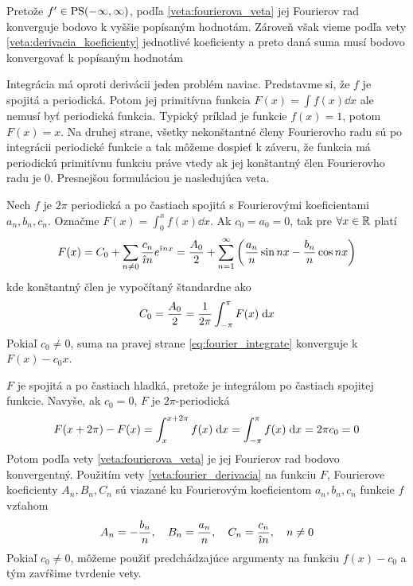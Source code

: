 \begin{dokaz}
  Pretože $f'\in \mbox{PS}(-\infty,\infty)$, podľa \ref{veta:fourierova_veta} jej Fourierov rad
  konverguje bodovo k vyššie popísaným hodnotám. Zároveň však vieme
  podľa vety \ref{veta:derivacia_koeficienty} jednotlivé koeficienty
  a preto daná suma musí bodovo konvergovať k popísaným hodnotám
\end{dokaz}

Integrácia má oproti derivácii jeden problém naviac.
Predstavme si, že $f$ je spojitá a periodická. Potom jej primitívna
funkcia
$F(x) = \int f(x) \dd x$ ale nemusí byť periodická funkcia.
Typický príklad je funkcie $f(x)=1$, potom $F(x)=x$. Na druhej strane,
 všetky nekonštantné členy Fourierovho radu sú po integrácii
 periodické funkcie a tak môžeme dospieť k záveru, že funkcia má
 periodickú primitívnu funkciu práve vtedy ak jej konštantný člen
 Fourierovho radu je 0. Presnejšou formuláciou je nasledujúca veta.

\begin{veta}
    Nech $f$ je $2\pi$ periodická a po častiach spojitá s Fourierovými
    koeficientami $a_n,b_n,c_n$. Označme
    $F(x) = \int_{0}^{x} f(x) \dd x$. Ak $c_0 = a_0 =0$, tak 
    pre $\forall x\in {\mathbb R}$ platí
    \begin{equation}
        F(x) = C_0 + \sum_{n\not=0} \frac{c_n}{\hat{\imath} n} e^{\hat{\imath} n x}
        = \frac{A_0}{2} + \sum_{n=1}^{\infty} \left(
                \frac{a_n}{n} \sin nx - \frac{b_n}{n} \cos nx\right)
    \label{eq:fourier_integrate}
    \end{equation}
    kde konštantný člen je vypočítaný štandardne ako 
    \begin{equation*}
        C_0 = \frac{A_0}{2} = \frac{1}{2\pi} \int_{-\pi}^{\pi} F(x) \; \mathrm{d} x
    \end{equation*}
    Pokiaľ $c_0\not=0$, suma na pravej strane
    \eqref{eq:fourier_integrate} konverguje k $F(x) - c_0 x$.
    \label{veta:fourier_integrovanie}
\end{veta}

\begin{dokaz}
    $F$ je spojitá a po častiach hladká, pretože je integrálom po
    častiach spojitej funkcie. Navyše, ak $c_0=0$, $F$ je
    $2\pi$-periodická 
    \begin{equation*}
        F(x + 2\pi) -F(x) =\int_x^{x+2\pi} f(x) \; \mathrm{d} x =
            \int_{-\pi}^{\pi} f(x) \; \mathrm{d} x = 2 \pi c_0 = 0
    \end{equation*}
    Potom podľa vety \ref{veta:fourierova_veta} je jej
    Fourierov rad bodovo konvergentný. Použitím vety
    \ref{veta:fourier_derivacia} na funkciu $F$, Fourierove
    koeficienty $A_n,B_n,C_n$ sú viazané ku Fourierovým koeficientom
    $a_n,b_n,c_n$ funkcie $f$ vzťahom
    \begin{equation*}
        A_n = -\frac{b_n}{n}, \quad
        B_n = \frac{a_n}{n}, \quad
        C_n = \frac{c_n}{\hat{\imath} n}, \quad n\not=0
    \end{equation*}
    Pokiaľ $c_0\not=0$, môžeme použiť predchádzajúce argumenty na
    funkciu $f(x)-c_0$ a tým zavŕšime tvrdenie vety.    
    \end{dokaz}

